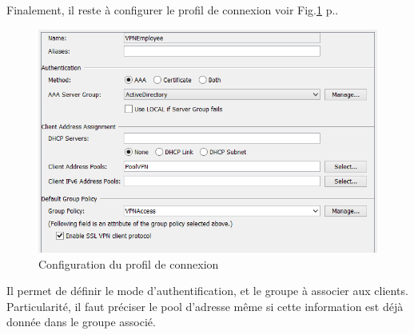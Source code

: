 Finalement, il reste à configurer le profil de connexion voir Fig.\ref{fig:cpCisco} p.\pageref{fig:cpCisco}.
\begin{figure}[ht]
	\centering
	\includegraphics{Cisco/ConnectionProfile.png}
	\caption{Configuration du profil de connexion}
	\label{fig:cpCisco}
\end{figure} 
Il permet de définir le mode d'authentification, et le groupe à associer aux clients.
Particularité, il faut préciser le pool d'adresse même si cette information est déjà donnée dans le groupe associé.
